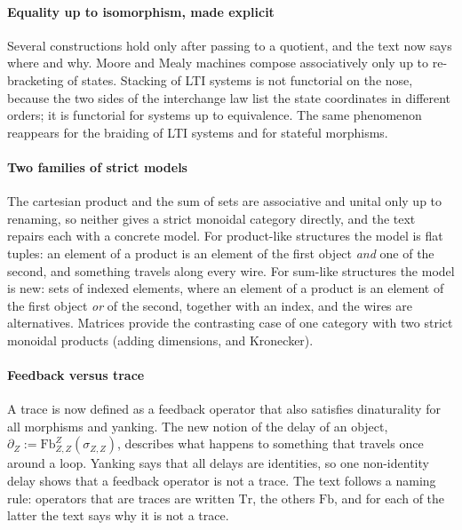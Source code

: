 \documentclass[11pt,a4paper]{article}
\newcommand{\Fb}{\mathrm{Fb}}
\newcommand{\Tr}{\mathrm{Tr}}
\begin{document}
\paragraph{Equality up to isomorphism, made explicit} Several constructions hold only after
passing to a quotient, and the text now says where and why. Moore and Mealy machines compose
associatively only up to re-bracketing of states. Stacking of LTI systems is not functorial on
the nose, because the two sides of the interchange law list the state coordinates in different
orders; it is functorial for systems up to equivalence. The same phenomenon reappears for the
braiding of LTI systems and for stateful morphisms.

\paragraph{Two families of strict models} The cartesian product and the sum of sets are associative and unital only up to renaming, so
neither gives a strict monoidal category directly, and the text repairs each with a concrete
model. For product-like structures the model is flat tuples: an element of a product is an
element of the first object \emph{and} one of the second, and something travels along every
wire. For sum-like structures the model is new: sets of indexed elements, where an element of a
product is an element of the first object \emph{or} of the second, together with an index, and
the wires are alternatives. Matrices provide the contrasting case of one category with two
strict monoidal products (adding dimensions, and Kronecker).

\paragraph{Feedback versus trace} A trace is now defined as a feedback operator that also
satisfies dinaturality for all morphisms and yanking. The new notion of the delay of an object,
$\partial_Z := \Fb^Z_{Z,Z}(\sigma_{Z,Z})$, describes what happens to something that travels once
around a loop. Yanking says that all delays are identities, so one non-identity delay shows that
a feedback operator is not a trace. The text follows a naming rule: operators that are traces are
written $\Tr$, the others $\Fb$, and for each of the latter the text says why it is not a trace.
\end{document}
